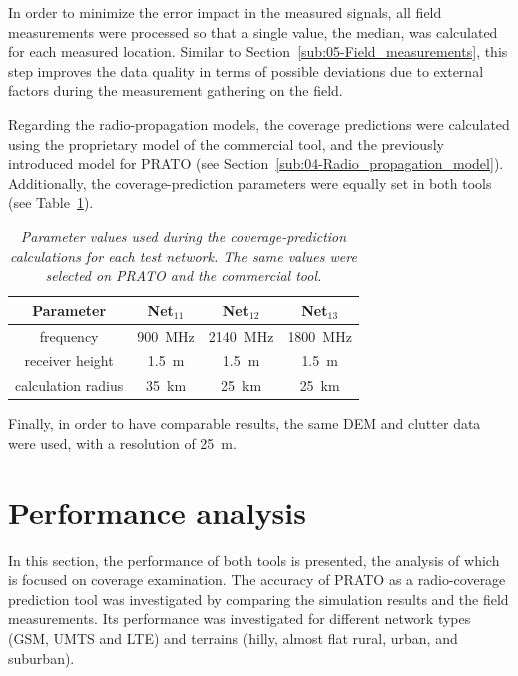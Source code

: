 In order to minimize the error impact in the measured signals, all
field measurements were processed so that a single value, the median,
was calculated for each measured location. Similar to Section~\ref{sub:05-Field_measurements},
this step improves the data quality in terms of possible deviations
due to external factors during the measurement gathering on the field.

Regarding the radio-propagation models, the coverage predictions were
calculated using the proprietary model of the commercial tool, and
the previously introduced model for PRATO (see Section~\ref{sub:04-Radio_propagation_model}).
Additionally, the coverage-prediction parameters were equally set
in both tools (see Table~\ref{tab:08-Coverage_prediction_parameters}).

\begin{table}
\centering

\caption{\textit{\emph{Parameter values used during the coverage-prediction
calculations for each test network. The same values were selected
on PRATO and the commercial tool.\label{tab:08-Coverage_prediction_parameters}}}}


{\small{}}%
\begin{tabular}{cccc}
\toprule 
Parameter & Net$_{11}$ & Net$_{12}$ & Net$_{13}$\tabularnewline
\midrule 
frequency & {\small{900~MHz}} & {\small{2140~MHz}} & {\small{1800~MHz}}\tabularnewline
receiver height & {\small{1.5~m}} & {\small{1.5~m}} & {\small{1.5~m}}\tabularnewline
calculation radius & {\small{35~km}} & {\small{25~km}} & {\small{25~km}}\tabularnewline
\bottomrule
\end{tabular}
\end{table}


Finally, in order to have comparable results, the same DEM and clutter
data were used, with a resolution of 25~m.


\section{Performance analysis \label{sec:08-Performance_analysis}}

In this section, the performance of both tools is presented, the analysis
of which is focused on coverage examination. The accuracy of PRATO
as a radio-coverage prediction tool was investigated by comparing
the simulation results and the field measurements. Its performance
was investigated for different network types (GSM, UMTS and LTE) and
terrains (hilly, almost flat rural, urban, and suburban).

